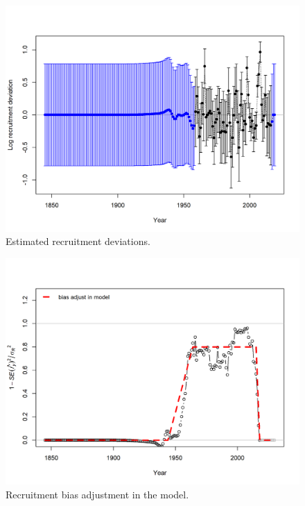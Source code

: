 \documentclass[12pt,]{article}
\begin{document}
\FloatBarrier

\begin{figure}
\centering
\includegraphics{r4ss/plots_mod1/recdevs2_withbars.png}
\caption{Estimated recruitment deviations. \label{fig:rec_devs}}
\end{figure}

\FloatBarrier

\begin{figure}
\centering
\includegraphics{r4ss/plots_mod1/recruit_fit_bias_adjust.png}
\caption{Recruitment bias adjustment in the model.
\label{fig:bias_adjust}}
\end{figure}

\FloatBarrier
\end{document}
